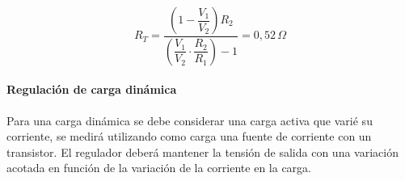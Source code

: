\documentclass[]{article}
\begin{document}
	\begin{equation} 
		R_T =
		\frac{
			\left(
			1-\dfrac{V_1}{V_2}
			\right)R_2
		}{
			\left(
			\dfrac{V_1}{V_2}\cdot\dfrac{R_2}{R_1}
			\right)-1
		} = 0,52 \, \Omega
		\label{eq:rt_general}
	\end{equation}
	
	
	\paragraph{Regulación de carga dinámica}\hfill\break
	
	Para una carga dinámica se debe considerar una carga activa que varié su corriente, se medirá utilizando como carga una fuente de corriente con un transistor. El regulador deberá mantener la tensión de salida con una variación acotada en
	función de la variación de la corriente en la carga.
	
\end{document}
